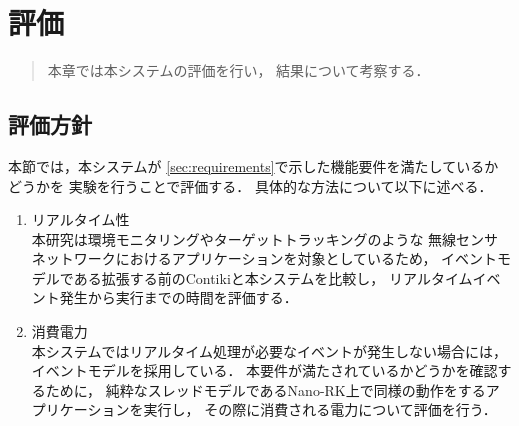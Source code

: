 \chapter{評価}
\begin{large}
\begin{quote}
本章では本システムの評価を行い，
結果について考察する．
\end{quote}
\end{large}
\clearpage

\section{評価方針}
本節では，本システムが
\ref{sec:requirements}で示した機能要件を満たしているかどうかを
実験を行うことで評価する．
具体的な方法について以下に述べる．


\begin{enumerate}
\item{リアルタイム性}\\
本研究は環境モニタリングやターゲットトラッキングのような
無線センサネットワークにおけるアプリケーションを対象としているため，
イベントモデルである拡張する前のContikiと本システムを比較し，
リアルタイムイベント発生から実行までの時間を評価する．
\newline
\item{消費電力}\\
本システムではリアルタイム処理が必要なイベントが発生しない場合には，
イベントモデルを採用している．
本要件が満たされているかどうかを確認するために，
純粋なスレッドモデルであるNano-RK上で同様の動作をするアプリケーションを実行し，
その際に消費される電力について評価を行う．
\end{enumerate}




%



